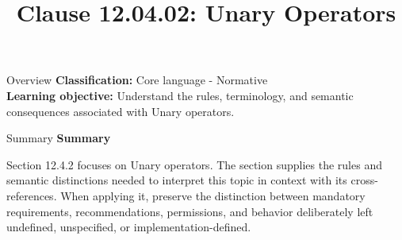 \documentclass[10pt,letterpaper]{article}
\title{Clause 12.04.02: Unary Operators}
\author{}
\date{}
\begin{document}
\maketitle
\begin{CornellOverviewBox}{Overview}
\textbf{Classification:} Core language - Normative\\[2pt]
\textbf{Learning objective:} Understand the rules, terminology, and semantic consequences associated with Unary operators.
\end{CornellOverviewBox}\begin{CornellSummaryBox}{Summary}
{\sffamily\bfseries\color{Accent} Summary}\par\vspace{3pt}Section 12.4.2 focuses on Unary operators. The section supplies the rules and semantic distinctions needed to interpret this topic in context with its cross-references. When applying it, preserve the distinction between mandatory requirements, recommendations, permissions, and behavior deliberately left undefined, unspecified, or implementation-defined.
\end{CornellSummaryBox}
\end{document}
